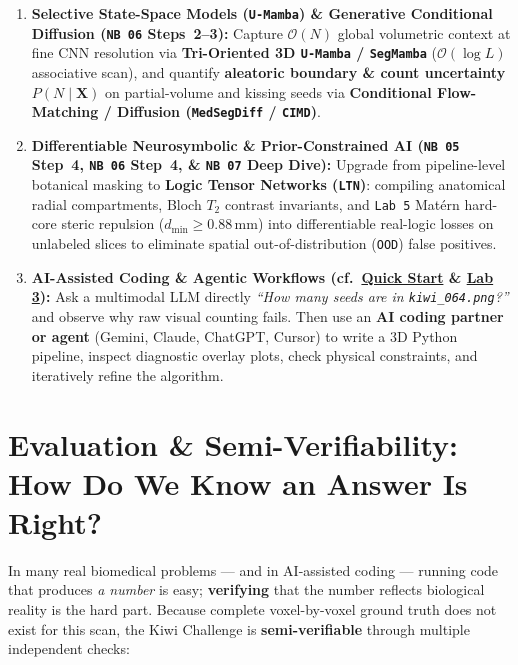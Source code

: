 \documentclass[10pt,a4paper]{article}
\newcommand{\ghblob}{https://github.com/arvidl/BMED365-2027/blob/main}
\newcommand{\ghtree}{https://github.com/arvidl/BMED365-2027/tree/main}
\begin{document}
\begin{enumerate}
    \item \textbf{Selective State-Space Models (\texttt{U-Mamba}) \& Generative Conditional Diffusion (\texttt{NB 06} Steps~2--3):} Capture $\mathcal{O}(N)$ global volumetric context at fine CNN resolution via \textbf{Tri-Oriented 3D \texttt{U-Mamba} / \texttt{SegMamba}} ($\mathcal{O}(\log L)$ associative scan), and quantify \textbf{aleatoric boundary \& count uncertainty} $P(N \mid \mathbf{X})$ on partial-volume and kissing seeds via \textbf{Conditional Flow-Matching / Diffusion (\texttt{MedSegDiff} / \texttt{CIMD})}.
    \item \textbf{Differentiable Neurosymbolic \& Prior-Constrained AI (\texttt{NB 05} Step~4, \texttt{NB 06} Step~4, \& \texttt{NB 07} Deep Dive):} Upgrade from pipeline-level botanical masking to \textbf{Logic Tensor Networks (\texttt{LTN})}: compiling anatomical radial compartments, Bloch $T_2$ contrast invariants, and \texttt{Lab 5} Mat\'ern hard-core steric repulsion ($d_{\min} \ge 0.88\,\text{mm}$) into differentiable real-logic losses on unlabeled slices to eliminate spatial out-of-distribution (\texttt{OOD}) false positives.
    \item \textbf{AI-Assisted Coding \& Agentic Workflows (cf.\ \href{\ghblob/Lab-QuickStart/README.md}{Quick Start} \& \href{\ghtree/Lab3-GenAI-LLM}{Lab 3}):} Ask a multimodal LLM directly \textit{``How many seeds are in \texttt{kiwi\_064.png}?''} and observe why raw visual counting fails. Then use an \textbf{AI coding partner or agent} (Gemini, Claude, ChatGPT, Cursor) to write a 3D Python pipeline, inspect diagnostic overlay plots, check physical constraints, and iteratively refine the algorithm.
\end{enumerate}

\section{Evaluation \& Semi-Verifiability: How Do We Know an Answer Is Right?}
\label{sec:eval}

In many real biomedical problems --- and in AI-assisted coding --- running code that produces \textit{a number} is easy; \textbf{verifying} that the number reflects biological reality is the hard part. Because complete voxel-by-voxel ground truth does not exist for this scan, the Kiwi Challenge is \textbf{semi-verifiable} through multiple independent checks:
\end{document}
